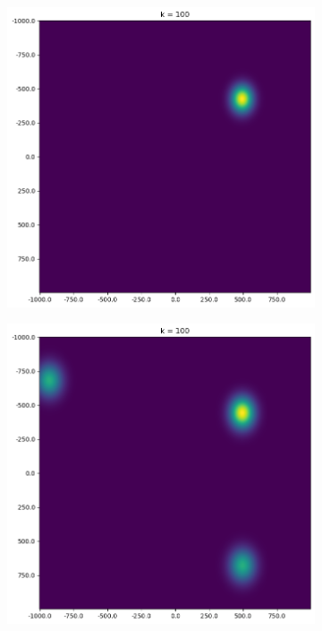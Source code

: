\begin{figure}
    \centering
    \begin{subfigure}[]{0.48\linewidth}
        \centering
        \includegraphics[width=\linewidth]{figures/c2-post-good.png}
    \end{subfigure}
    \hfill
    \begin{subfigure}[]{0.48\linewidth}
        \centering
        \includegraphics[width=\linewidth]{figures/c2-pos-bad.png}

\end{subfigure}
\end{figure}
